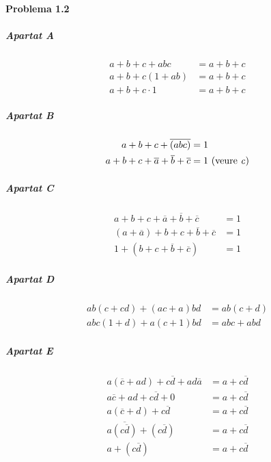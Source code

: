 \documentclass[catalan,border=15pt,class=scrartcl,multi=minipage]{standalone}
\begin{document}
\begin{minipage}{30em}

\paragraph{Problema 1.2}

\subparagraph{Apartat A} \begin{align*}
  a + b + c + abc &= a + b + c \\
  a + b + c\left(1 + ab\right) &= a + b + c \\
  a + b + c \cdot 1 &= a + b + c
\end{align*}

\subparagraph{Apartat B} \begin{align*}
  a + b + c + \overline{\left(abc\right)} &= 1 \\
  a + b + c + \overline{a} + \overline{b} + \overline{c} &= 1 \,\, \text{(veure \emph{c})}
\end{align*}

\subparagraph{Apartat C} \begin{align*}
  a + b + c + \overline{a} + \overline{b} + \overline{c} &= 1 \\
  \left(a + \overline{a}\right) + b + c + \overline{b} + \overline{c} &= 1 \\
  1 + \left(b + c + \overline{b} + \overline{c}\right) &= 1
\end{align*}

\subparagraph{Apartat D} \begin{align*}
  ab\left(c + cd\right) + \left(ac + a\right)bd &= ab\left(c + d\right) \\
  abc\left(1 + d\right) + a\left(c + 1\right)bd &= abc + abd
\end{align*}

\subparagraph{Apartat E} \begin{align*}
  a\left(\overline{c} + ad\right) + c\overline{d} + ad\overline{a} &= a + c\overline{d} \\
  a\overline{c} + ad + c\overline{d} + 0 &= a + c\overline{d} \\
  a\left(\overline{c} + d\right) + c\overline{d} &= a + c\overline{d} \\
  a\overline{\left(c\overline{d}\right)} + \left(c\overline{d}\right) &= a + c\overline{d} \\
  a + \left(c\overline{d}\right) &= a + c\overline{d}
\end{align*}


\end{minipage}
\end{document}
